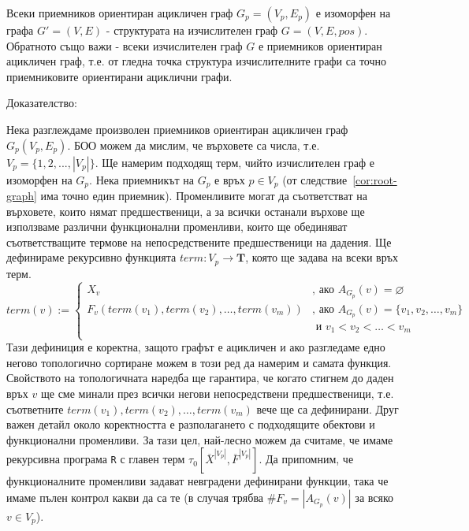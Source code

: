 \documentclass[12pt,twoside,a4paper]{article}
\begin{document}
	\begin{statement}\label{stmnt:gen-graph} Всеки приемников ориентиран ацикличен граф $G_p=(V_p,E_p)$ е изоморфен на графа $G'=(V,E)$ - структурата на изчислителен граф $G=(V,E,pos)$. Обратното също важи - всеки изчислителен граф $G$ е приемников ориентиран ацикличен граф, т.е. от гледна точка структура изчислителните графи са точно приемниковите ориентирани ациклични графи.
		
		\noindent Доказателство:
		
		Нека разглеждаме произволен приемников ориентиран ацикличен граф $G_p(V_p,E_p)$. БОО можем да мислим, че върховете са числа, т.е. $V_p = \{1, 2, ..., |V_p|\}$. Ще намерим подходящ терм, чийто изчислителен граф е изоморфен на $G_p$. Нека приемникът на $G_p$ е връх $p \in V_p$ (от следствие~\ref{cor:root-graph} има точно един приемник). Променливите могат да съответстват на върховете, които нямат предшественици, а за всички останали върхове ще използваме различни функционални променливи, които ще обединяват съответстващите термове на непосредствените предшественици на дадения. Ще дефинираме рекурсивно функцията $term \colon V_p \to \mathbf{T}$, която ще задава на всеки връх терм.
		\begin{equation*}
			term(v) :=
			\begin{cases}
				X_v & \text{, ако }A_{G_p}(v)=\varnothing\\
				F_v(term(v_1), term(v_2), \dots, term(v_m)) & \text{, ако }A_{G_p}(v)=\{v_1, v_2, \dots, v_m\}\\
				&\text{ и }v_1 < v_2 < \dots < v_m\\
			\end{cases}
		\end{equation*}
		Тази дефиниция е коректна, защото графът е ацикличен и ако разгледаме едно негово топологично сортиране можем в този ред да намерим и самата функция. Свойството на топологичната наредба ще гарантира, че когато стигнем до даден връх $v$ ще сме минали през всички негови непосредствени предшественици, т.е. съответните $term(v_1), term(v_2), \dots, term(v_m)$ вече ще са дефинирани. Друг важен детайл около коректността е разполагането с подходящите обектови и функционални променливи. За тази цел, най-лесно можем да считаме, че имаме рекурсивна програма \texttt{R} с главен терм $\tau_0[\overline{X}^{|V_p|},\overline{F}^{|V_p|}]$. Да припомним, че функционалните променливи задават невградени дефинирани функции, така че имаме пълен контрол какви да са те (в случая трябва $\#F_v=|A_{G_p}(v)|$ за всяко $v \in V_p$).
		

\end{statement}
\end{document}
